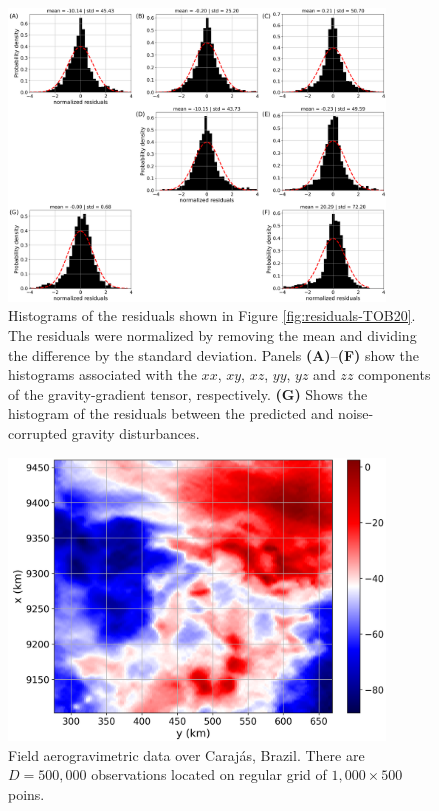 \begin{figure}[htbp]
	\begin{center}
		\includegraphics[width=10cm]{Fig/TOB20_histograms}
	\end{center}
	\caption{
		Histograms of the residuals shown in Figure \ref{fig:residuals-TOB20}.
		The residuals were normalized by removing the mean and dividing the difference
		by the standard deviation.
		Panels \textbf{(A)}--\textbf{(F)} show the histograms associated with the 
		$xx$, $xy$, $xz$, $yy$, $yz$ and $zz$ components of the gravity-gradient tensor, respectively. 
		\textbf{(G)} Shows the histogram of the residuals between the predicted and noise-corrupted gravity disturbances.
	}
	\label{fig:histograms-TOB20}
\end{figure}

\begin{figure}[htbp]
	\begin{center}
		\includegraphics[width=10cm]{Fig/carajas_data}
	\end{center}
	\caption{
		Field aerogravimetric data over Caraj{\'a}s, Brazil. 
		There are $D = 500, 000$ observations located on regular grid of $1,000 \times 500$ poins.
		}
	\label{fig:carajas-data}
\end{figure}

